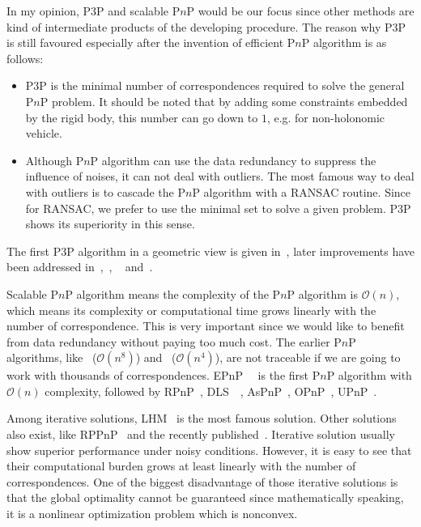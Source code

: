 \documentclass[a4paper]{article}
\begin{document}
In my opinion, P$3$P and scalable P$n$P would be our focus since other methods are kind of intermediate products of the developing procedure. The reason why P$3$P is still favoured especially after the invention of efficient P$n$P algorithm is as follows:
\begin{itemize}
\item P$3$P is the minimal number of correspondences required to solve the general P$n$P problem. It should be noted that by adding some constraints embedded by the rigid body, this number can go down to $1$, e.g. for non-holonomic vehicle.
\item Although P$n$P algorithm can use the data redundancy to suppress the influence of noises, it can not deal with outliers. The most famous way to deal with outliers is to cascade the P$n$P algorithm with a RANSAC routine. Since for RANSAC, we prefer to use the minimal set to solve a given problem. P$3$P shows its superiority in this sense. 
\end{itemize}
The first P$3$P algorithm in a geometric view is given in~\cite{fischler1981random}, later improvements have been addressed in~\cite{pop00011},~\cite{gao2003complete}, ~\cite{li2011stable} and~\cite{kneip2011novel}.

Scalable P$n$P algorithm means the complexity of the P$n$P algorithm is $\mathcal{O}(n)$, which means its complexity or computational time grows linearly with the number of correspondence. This is very important since we would like to benefit from data redundancy without paying too much cost. The earlier P$n$P algorithms, like~\cite{ansar2003linear} ($\mathcal{O}(n^8)$) and~\cite{quan1999linear} ($\mathcal{O}(n^4)$), are not traceable if we are going to work with thousands of correspondences. EPnP~\cite{lepetit2009epnp}~\cite{moreno2007accurate} is the first P$n$P algorithm with $\mathcal{O}(n)$ complexity, followed by RPnP~\cite{li2012robust}, DLS~\cite{hesch2011direct}~\cite{nakano2015globally}, AsPnP~\cite{zheng2013aspnp}, OPnP~\cite{zheng2013revisiting}, UPnP~\cite{kneip2014upnp}.

Among iterative solutions, LHM~\cite{lu2000fast} is the most famous solution. Other solutions also exist, like RPPnP~\cite{garro2012solving} and the recently published~\cite{8470970}. Iterative solution usually show superior performance under noisy conditions. However, it is easy to see that their computational burden grows at least linearly with the number of correspondences. One of the biggest disadvantage of those iterative solutions is that the global optimality cannot be guaranteed since mathematically speaking, it is a nonlinear optimization problem which is nonconvex.
\end{document}
